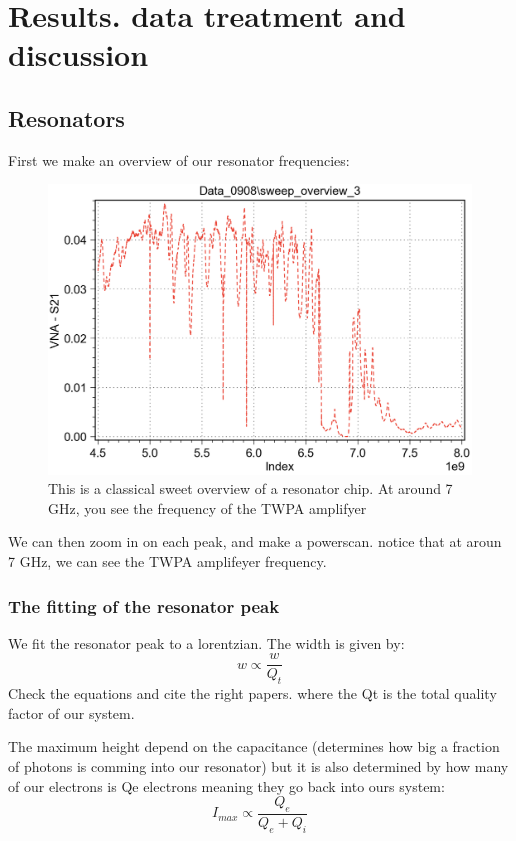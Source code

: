 \chapter{Results. data treatment and discussion}


\section{Resonators}
First we make an overview of our resonator frequencies:
\begin{figure}
    \centering
    \includegraphics[width = 13cm]{Images/sweep_overview_3.png}
    \caption{This is a classical sweet overview of a resonator chip. At around 7 GHz, you see the frequency of the TWPA amplifyer}
    \label{fig:sweep_overview}
\end{figure}
We can then zoom in on each peak, and make a powerscan. notice that at aroun 7 GHz, we can see the TWPA amplifeyer frequency. 
\subsection{The fitting of the resonator peak}
We fit the resonator peak to a lorentzian. The width is given by: 
\begin{equation}
    w \propto \frac{w}{Q_t}
\end{equation}
Check the equations and cite the right papers. 
where the Qt is the total quality factor of our system. 

The maximum height depend on the capacitance (determines how big a fraction of photons is comming into our resonator) but it is also determined by how many of our electrons is Qe electrons meaning they go back into ours system: 
\begin{equation}
    I_{max} \propto \frac{Q_e}{Q_e + Q_i}
\end{equation}